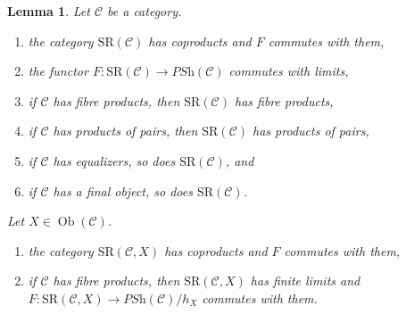 \documentclass{stacks-project}
\theoremstyle{plain}
\newtheorem{lemma}[subsection]{Lemma}
\theoremstyle{definition}
\theoremstyle{remark}
\numberwithin{equation}{subsection}
\def\Ob{\mathop{\mathrm{Ob}}\nolimits}
\begin{document}
\begin{lemma}
\label{lemma-coprod-prod-SR}
Let $\mathcal{C}$ be a category.
\begin{enumerate}
\item the category $\text{SR}(\mathcal{C})$ has coproducts
and $F$ commutes with them,
\item the functor $F : \text{SR}(\mathcal{C}) \to \textit{PSh}(\mathcal{C})$
commutes with limits,
\item if $\mathcal{C}$ has fibre products, then $\text{SR}(\mathcal{C})$
has fibre products,
\item if $\mathcal{C}$ has products of pairs, then
$\text{SR}(\mathcal{C})$ has products of pairs,
\item if $\mathcal{C}$ has equalizers, so does $\text{SR}(\mathcal{C})$, and
\item if $\mathcal{C}$ has a final object, so does $\text{SR}(\mathcal{C})$.
\end{enumerate}
Let $X \in \Ob(\mathcal{C})$.
\begin{enumerate}
\item the category $\text{SR}(\mathcal{C}, X)$ has coproducts
and $F$ commutes with them,
\item if $\mathcal{C}$ has fibre products, then $\text{SR}(\mathcal{C}, X)$
has finite limits and
$F : \text{SR}(\mathcal{C}, X) \to \textit{PSh}(\mathcal{C})/h_X$
commutes with them.
\end{enumerate}
\end{lemma}
\end{document}
